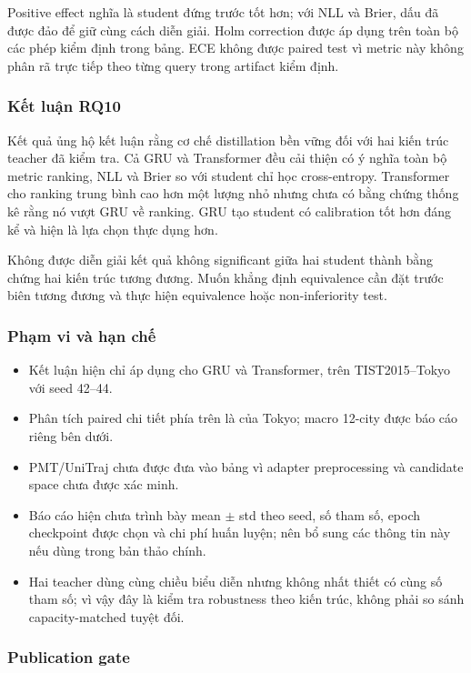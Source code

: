 Positive effect nghĩa là student đứng trước tốt hơn; với NLL và Brier, dấu đã được đảo để giữ cùng cách diễn giải. Holm correction được áp dụng trên toàn bộ các phép kiểm định trong bảng. ECE không được paired test vì metric này không phân rã trực tiếp theo từng query trong artifact kiểm định.

\subsubsection*{Kết luận RQ10}

Kết quả ủng hộ kết luận rằng cơ chế distillation bền vững đối với hai kiến trúc teacher đã kiểm tra. Cả GRU và Transformer đều cải thiện có ý nghĩa toàn bộ metric ranking, NLL và Brier so với student chỉ học cross-entropy. Transformer cho ranking trung bình cao hơn một lượng nhỏ nhưng chưa có bằng chứng thống kê rằng nó vượt GRU về ranking. GRU tạo student có calibration tốt hơn đáng kể và hiện là lựa chọn thực dụng hơn.

Không được diễn giải kết quả không significant giữa hai student thành bằng chứng hai kiến trúc tương đương. Muốn khẳng định equivalence cần đặt trước biên tương đương và thực hiện equivalence hoặc non-inferiority test.

\subsubsection*{Phạm vi và hạn chế}

\begin{itemize}
\item Kết luận hiện chỉ áp dụng cho GRU và Transformer, trên TIST2015--Tokyo với seed 42--44.
\item Phân tích paired chi tiết phía trên là của Tokyo; macro 12-city được báo cáo riêng bên dưới.
\item PMT/UniTraj chưa được đưa vào bảng vì adapter preprocessing và candidate space chưa được xác minh.
\item Báo cáo hiện chưa trình bày mean $\pm$ std theo seed, số tham số, epoch checkpoint được chọn và chi phí huấn luyện; nên bổ sung các thông tin này nếu dùng trong bản thảo chính.
\item Hai teacher dùng cùng chiều biểu diễn nhưng không nhất thiết có cùng số tham số; vì vậy đây là kiểm tra robustness theo kiến trúc, không phải so sánh capacity-matched tuyệt đối.
\end{itemize}

\subsubsection*{Publication gate}


